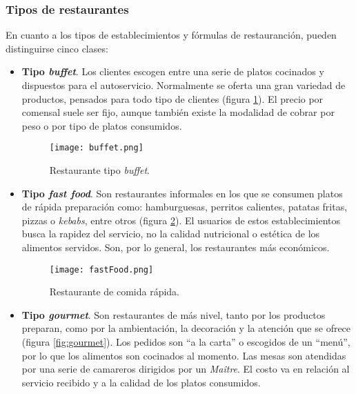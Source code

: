     \subsubsection{Tipos de restaurantes}
  En cuanto a los tipos de establecimientos y fórmulas de restauranción, pueden
  distinguirse cinco clases\cite{bib:wiki}:
  \begin{itemize}
  \item \textbf{Tipo \emph{buffet}}. Los clientes escogen entre una serie de
  platos cocinados y dispuestos para el autoservicio. Normalmente se oferta
  una gran variedad de productos, pensados para todo tipo de clientes (figura
  \ref{fig:buffet}). El precio por comensal suele ser fijo, aunque también
  existe la modalidad de cobrar por peso o por tipo de platos consumidos.

  \begin{figure}[!h]
    \begin{center}
      \texttt{[image: buffet.png]}
      \caption{Restaurante tipo \emph{buffet}.}
      \label{fig:buffet}
    \end{center}
  \end{figure}

  \item \textbf{Tipo \emph{fast food}}. Son restaurantes informales en los que
  se consumen platos de rápida preparación como: hamburguesas, perritos
  calientes, patatas fritas, pizzas o \emph{kebabs}, entre otros (figura
  \ref{fig:fastFood}). El usuarios de estos establecimientos busca la rapidez 
  del servicio, no la calidad nutricional o estética de los alimentos 
  servidos. Son, por lo general, los restaurantes más económicos.

  \begin{figure}[!h]
    \begin{center}
      \texttt{[image: fastFood.png]}
      \caption{Restaurante de comida rápida.}
      \label{fig:fastFood}
    \end{center}
  \end{figure}

  \item \textbf{Tipo \emph{gourmet}}. Son restaurantes de más nivel, tanto por
  los productos preparan, como por la ambientación, la decoración y la atención
  que se ofrece (figura \ref{fig:gourmet}). Los pedidos son ``a la carta'' o
  escogidos de un ``menú'', por lo que los alimentos son cocinados al momento.
  Las mesas son atendidas por una serie de camareros dirigidos por un
  \emph{Maître}. El costo va en relación al servicio recibido y a la calidad de
  los platos consumidos.


\end{itemize}
